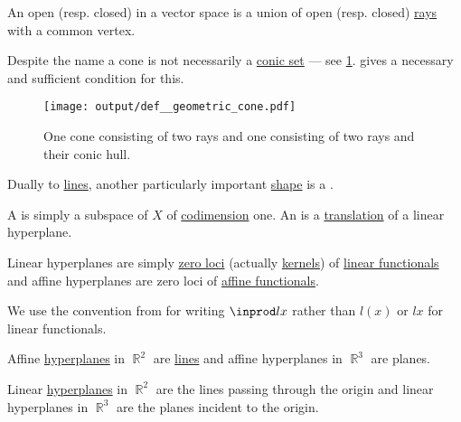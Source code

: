 \begin{definition}\label{def:geometric_cone}
  An open (resp. closed)  in a  vector space is a union of open (resp. closed) \hyperref[def:geometric_ray]{rays} with a common vertex.

  Despite the name a cone is not necessarily a \hyperref[def:conic_hull]{conic set} --- see \cref{fig:def:geometric_cone}.  gives a necessary and sufficient condition for this.

  \begin{figure}[!ht]
    \centering
    \texttt{[image: output/def\_\_geometric\_cone.pdf]}
    \caption{One cone consisting of two rays and one consisting of two rays and their conic hull.}\label{fig:def:geometric_cone}
  \end{figure}
\end{definition}

\begin{definition}\label{def:hyperplane}
  Dually to \hyperref[def:geometric_line]{lines}, another particularly important \hyperref[rem:geometric_shape]{shape} is a .

  \begin{thmenum}
     A  is simply a subspace of \( X \) of \hyperref[thm:vector_space_dimension]{codimension} one. An  is a \hyperref[def:rigid_motion/translation]{translation} of a linear hyperplane.

     Linear hyperplanes are simply \hyperref[def:zero_locus]{zero loci} (actually \hyperref[def:module/kernel]{kernels}) of \hyperref[def:semimodule/homomorphism]{linear functionals} and affine hyperplanes are zero loci of \hyperref[def:affine_operator]{affine functionals}.

    We use the convention from  for writing \( \inprod l x \) rather than \( l(x) \) or \( lx \) for linear functionals.
  \end{thmenum}
\end{definition}

\begin{example}\label{ex:hyperplanes}
  Affine \hyperref[def:hyperplane]{hyperplanes} in \( \BbbR^2 \) are \hyperref[def:geometric_line]{lines} and affine hyperplanes in \( \BbbR^3 \) are planes.

  Linear \hyperref[def:hyperplane]{hyperplanes} in \( \BbbR^2 \) are the lines passing through the origin and linear hyperplanes in \( \BbbR^3 \) are the planes incident to the origin.
\end{example}

